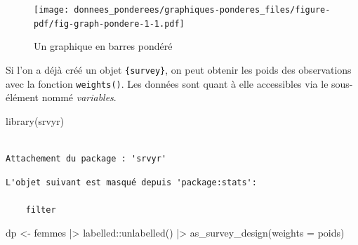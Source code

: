 \documentclass[
  letterpaper,
  DIV=11,
  numbers=noendperiod,
  oneside]{scrreprt}
\newenvironment{Shaded}{\begin{snugshade}}{\end{snugshade}}
\newcommand{\AttributeTok}[1]{\textcolor[rgb]{0.40,0.45,0.13}{#1}}
\newcommand{\FunctionTok}[1]{\textcolor[rgb]{0.28,0.35,0.67}{#1}}
\newcommand{\NormalTok}[1]{\textcolor[rgb]{0.00,0.23,0.31}{#1}}
\newcommand{\OtherTok}[1]{\textcolor[rgb]{0.00,0.23,0.31}{#1}}
\newcommand{\SpecialCharTok}[1]{\textcolor[rgb]{0.37,0.37,0.37}{#1}}
\newcommand{\StringTok}[1]{\textcolor[rgb]{0.13,0.47,0.30}{#1}}
\begin{document}
\begin{figure}[H]

{\centering \texttt{[image: donnees\_ponderees/graphiques-ponderes\_files/figure-pdf/fig-graph-pondere-1-1.pdf]}

}

\caption{\label{fig-graph-pondere-1}Un graphique en barres pondéré}

\end{figure}

Si l'on a déjà créé un objet \texttt{\{survey\}}, on peut obtenir les
poids des observations avec la fonction \texttt{weights()}. Les données
sont quant à elle accessibles via le sous-élément nommé
\emph{variables}.

\begin{Shaded}
\begin{Highlighting}[]
\FunctionTok{library}\NormalTok{(srvyr)}
\end{Highlighting}
\end{Shaded}

\begin{verbatim}

Attachement du package : 'srvyr'
\end{verbatim}

\begin{verbatim}
L'objet suivant est masqué depuis 'package:stats':

    filter
\end{verbatim}

\begin{Shaded}
\begin{Highlighting}[]
\NormalTok{dp }\OtherTok{\textless{}{-}}\NormalTok{ femmes }\SpecialCharTok{|\textgreater{}} 
\NormalTok{  labelled}\SpecialCharTok{::}\FunctionTok{unlabelled}\NormalTok{() }\SpecialCharTok{|\textgreater{}} 
  \FunctionTok{as\_survey\_design}\NormalTok{(}\AttributeTok{weights =}\NormalTok{ poids)}
\end{Highlighting}
\end{Shaded}

\begin{Shaded}
\end{Shaded}
\end{document}
